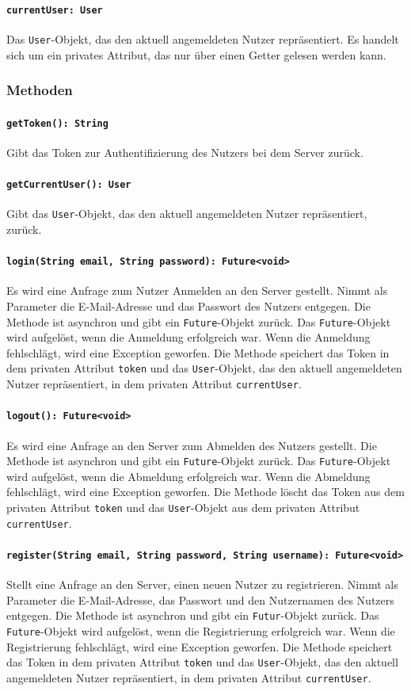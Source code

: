 \documentclass{entwurfsheft}
\begin{document}
\paragraph{\texttt{currentUser: User}}
Das \texttt{User}-Objekt, das den aktuell angemeldeten Nutzer repräsentiert. Es handelt sich um ein privates Attribut, das nur über einen Getter gelesen werden kann.
\subsubsection*{Methoden}
\paragraph{\texttt{getToken(): String}}
Gibt das Token zur Authentifizierung des Nutzers bei dem Server zurück.
\paragraph{\texttt{getCurrentUser(): User}}
Gibt das \texttt{User}-Objekt, das den aktuell angemeldeten Nutzer repräsentiert, zurück.
\paragraph{\texttt{login(String email, String password): Future<void>}}
Es wird eine Anfrage zum Nutzer Anmelden an den Server gestellt. Nimmt als Parameter die E-Mail-Adresse und das Passwort des Nutzers entgegen. Die Methode ist asynchron und gibt ein \texttt{Future}-Objekt zurück. Das \texttt{Future}-Objekt wird aufgelöst, wenn die Anmeldung erfolgreich war. Wenn die Anmeldung fehlschlägt, wird eine Exception geworfen. Die Methode speichert das Token in dem privaten Attribut \texttt{token} und das \texttt{User}-Objekt, das den aktuell angemeldeten Nutzer repräsentiert, in dem privaten Attribut \texttt{currentUser}.
\paragraph{\texttt{logout(): Future<void>}}
Es wird eine Anfrage an den Server zum Abmelden des Nutzers gestellt. Die Methode ist asynchron und gibt ein \texttt{Future}-Objekt zurück. Das \texttt{Future}-Objekt wird aufgelöst, wenn die Abmeldung erfolgreich war. Wenn die Abmeldung fehlschlägt, wird eine Exception geworfen. Die Methode löscht das Token aus dem privaten Attribut \texttt{token} und das \texttt{User}-Objekt aus dem privaten Attribut \texttt{currentUser}.
\paragraph{\texttt{register(String email, String password, String username): Future<void>}}
Stellt eine Anfrage an den Server, einen neuen Nutzer zu registrieren. Nimmt als Parameter die E-Mail-Adresse, das Passwort und den Nutzernamen des Nutzers entgegen. Die Methode ist asynchron und gibt ein \texttt{Futur}-Objekt zurück. Das \texttt{Future}-Objekt wird aufgelöst, wenn die Registrierung erfolgreich war. Wenn die Registrierung fehlschlägt, wird eine Exception geworfen. Die Methode speichert das Token in dem privaten Attribut \texttt{token} und das \texttt{User}-Objekt, das den aktuell angemeldeten Nutzer repräsentiert, in dem privaten Attribut \texttt{currentUser}.
\end{document}

